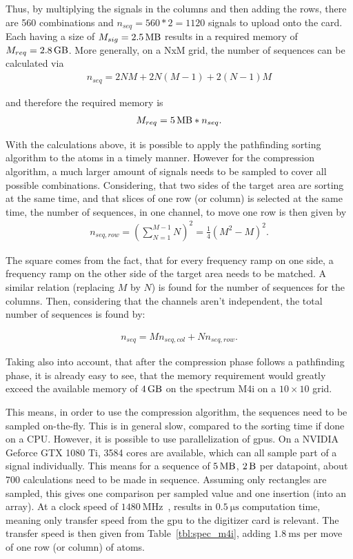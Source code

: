 Thus, by multiplying the signals in the columns and then adding the rows, there are 560 combinations and $n_{seq} = 560*2=1120$ signals to upload onto the card. Each having a size of $M_{sig} = \SI{2.5}{\mega\byte}$ results in a required memory of $M_{req}=\SI{2.8}{\giga\byte}$. More generally, on a NxM grid, the number of sequences can be calculated via
\begin{align}
	n_{seq} = 2 N M + 2 N (M-1) + 2 (N-1) M
\end{align}

and therefore the required memory is
\begin{align}
	M_{req} = \SI{5}{\mega\byte} * n_{seq}.
\end{align}

With the calculations above, it is possible to apply the pathfinding sorting algorithm to the atoms in a timely manner. However for the compression algorithm, a much larger amount of signals needs to be sampled to cover all possible combinations. Considering, that two sides of the target area are sorting at the same time, and that slices of one row (or column) is selected at the same time, the number of sequences, in one channel, to move one row is then given by
\begin{align}
	n_{seq,row} = {\left(\sum_{N=1}^{M-1} N\right)}^2 = \frac{1}{4} {(M^2-M)}^2.
\end{align}

The square comes from the fact, that for every frequency ramp on one side, a frequency ramp on the other side of the target area needs to be matched. A similar relation (replacing $M$ by $N$) is found for the number of sequences for the columns. Then, considering that the channels aren't independent, the total number of sequences is found by:

\begin{align}
	n_{seq} = M n_{seq,col} + N n_{seq,row}.
\end{align}

Taking also into account, that after the compression phase follows a pathfinding phase, it is already easy to see, that the memory requirement would greatly exceed the available memory of $\SI{4}{\giga\byte}$ on the spectrum M4i on a $10\times10$ grid.

This means, in order to use the compression algorithm, the sequences need to be sampled on-the-fly. This is in general slow, compared to the sorting time if done on a CPU\@. However, it is possible to use parallelization of \acp{gpu}. On a NVIDIA Geforce GTX 1080 Ti, 3584 cores are available, which can all sample part of a signal individually. This means for a sequence of $\SI{5}{\mega\byte}$, $\SI{2}{\byte}$ per datapoint, about 700 calculations need to be made in sequence. Assuming only rectangles are sampled, this gives one comparison per sampled value and one insertion (into an array). At a clock speed of $\SI{1480}{\mega\hertz}$~\cite{NVIDIA}, results in $\SI{0.5}{\micro\second}$ computation time, meaning only transfer speed from the \ac{gpu} to the digitizer card is relevant. The transfer speed is then given from Table~\ref{tbl:spec_m4i}, adding $\SI{1.8}{\milli\second}$ per move of one row (or column) of atoms.


